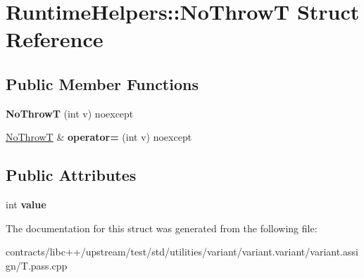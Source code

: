 \hypertarget{struct_runtime_helpers_1_1_no_throw_t}{}\section{Runtime\+Helpers\+:\+:No\+ThrowT Struct Reference}
\label{struct_runtime_helpers_1_1_no_throw_t}
\subsection*{Public Member Functions}
\begin{DoxyCompactItemize}
\item 
\mbox{\label{struct_runtime_helpers_1_1_no_throw_t_ab5095e08a5ff5b57257da285ee071085}} 
{\bfseries No\+ThrowT} (int v) noexcept
\item 
\mbox{\label{struct_runtime_helpers_1_1_no_throw_t_acb77b5689ca20962c150f20fb481f786}} 
\mbox{\hyperlink{struct_runtime_helpers_1_1_no_throw_t}{No\+ThrowT}} \& {\bfseries operator=} (int v) noexcept
\end{DoxyCompactItemize}
\subsection*{Public Attributes}
\begin{DoxyCompactItemize}
\item 
\mbox{\label{struct_runtime_helpers_1_1_no_throw_t_ad37b236a4675948f078bf4dfd969b7d5}} 
int {\bfseries value}
\end{DoxyCompactItemize}


The documentation for this struct was generated from the following file\+:\begin{DoxyCompactItemize}
\item 
contracts/libc++/upstream/test/std/utilities/variant/variant.\+variant/variant.\+assign/T.\+pass.\+cpp\end{DoxyCompactItemize}
